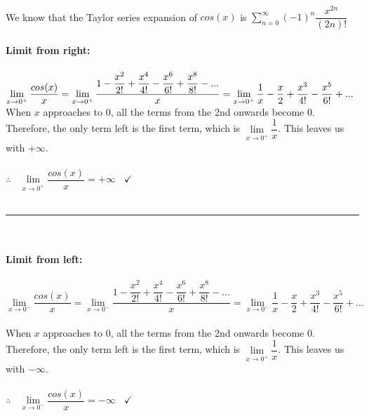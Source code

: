 \documentclass[fleqn]{article}
\begin{document}
\begin{enumerate}
\begin{itemize}
        \textcolor{hwColor}{
          \\
          We know that the Taylor series expansion of $cos(x)$ is 
          $
            \sum\limits_{n=0}^{\infty} (-1)^n \dfrac{x^{2n}}{(2n)!}
          $
          \\
          \\
          \textbf{Limit from right:}
          \\
          \\
          $
            \lim\limits_{x \to 0^+} \dfrac{cos(x)}{x}
            =\lim\limits_{x \to 0^+} \dfrac{1-\dfrac{x^2}{2!}+\dfrac{x^4}{4!}-\dfrac{x^6}{6!}+\dfrac{x^8}{8!}-...}{x}
            =\lim\limits_{x \to 0^+} \dfrac{1}{x}-\dfrac{x}{2}+\dfrac{x^3}{4!}-\dfrac{x^5}{6!}+...
            \\
            \\
          $
          When $x$ approaches to $0$, all the terms from the 2nd onwards become $0$. 
          Therefore, the only term left is the first term, which is $\lim\limits_{x \to 0^+} \dfrac{1}{x}$. This 
          leaves us with $+\infty$.
          \\
          \\
          $
            \therefore ~~~~ \lim\limits_{x \to 0^+} \dfrac{cos(x)}{x}=+\infty ~~~~ \checkmark
          $
          \\
          \\
          \rule{15cm}{2pt}
          \\
          \\
          \textbf{Limit from left:}
          \\
          \\
          $
            \lim\limits_{x \to 0^-} \dfrac{cos(x)}{x}
            =\lim\limits_{x \to 0^-} \dfrac{1-\dfrac{x^2}{2!}+\dfrac{x^4}{4!}-\dfrac{x^6}{6!}+\dfrac{x^8}{8!}-...}{x}
            =\lim\limits_{x \to 0^-} \dfrac{1}{x}-\dfrac{x}{2}+\dfrac{x^3}{4!}-\dfrac{x^5}{6!}+...
          $
          \\
          \\
          When $x$ approaches to $0$, all the terms from the 2nd onwards become $0$. 
          Therefore, the only term left is the first term, which is $\lim\limits_{x \to 0^+} \dfrac{1}{x}$. This 
          leaves us with $-\infty$.
          \\
          \\
          $
            \therefore ~~~~ \lim\limits_{x \to 0^-} \dfrac{cos(x)}{x}=-\infty ~~~~ \checkmark
          $
          \\
}
\end{itemize}
\end{enumerate}
\end{document}
